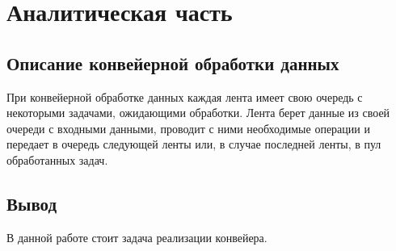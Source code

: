 \chapter{Аналитическая часть}

\section{Описание конвейерной обработки данных}

При конвейерной обработке данных каждая лента имеет свою очередь с некоторыми задачами, ожидающими обработки. Лента берет данные из своей очереди с входными данными, проводит с ними необходимые операции и передает в очередь следующей ленты или, в случае последней ленты, в пул обработанных задач.

\section*{Вывод}
В данной работе стоит задача реализации конвейера.
